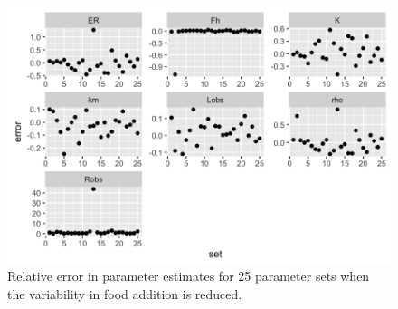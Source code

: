 \documentclass[12pt,reqno,final,pdftex]{amsart}\usepackage[]{graphicx}\usepackage[]{color}
\newenvironment{knitrout}{}{} %
\theoremstyle{plain}
\numberwithin{equation}{part}
\begin{document}
\begin{knitrout}\scriptsize
{}\color{fgcolor}\begin{figure}

\includegraphics[width=\linewidth]{figure/rep-cost-est-3-1} \hfill{}

\caption[Relative error in parameter estimates for 25 parameter sets when the variability in food addition is reduced]{Relative error in parameter estimates for 25 parameter sets when the variability in food addition is reduced.}\label{fig:rep-cost-est-3}
\end{figure}


\end{knitrout}
\end{document}

